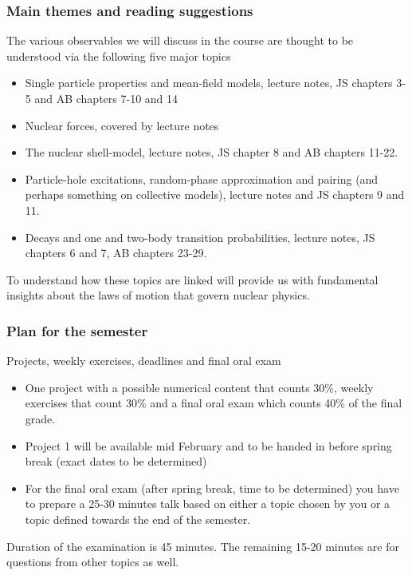 \documentclass{beamer}
\begin{document}
\begin{frame}
\frametitle{Main themes and reading suggestions}

\begin{block}{}
The various observables we will discuss in the course are thought to be understood via the following five 
major topics
\begin{itemize}
\item Single  particle properties and mean-field models, lecture notes, JS chapters 3-5 and AB chapters 7-10 and 14

\item Nuclear forces, covered by lecture notes

\item The nuclear shell-model, lecture notes, JS chapter 8 and AB chapters 11-22.

\item Particle-hole excitations, random-phase approximation and pairing (and perhaps something on collective models), lecture notes and JS chapters 9 and 11.

\item Decays and one and two-body transition probabilities, lecture notes, JS chapters 6 and 7, AB chapters 23-29.
\end{itemize}

\noindent
To understand how these topics are linked will provide us with fundamental insights about the laws of motion that govern nuclear physics.
\end{block}
\end{frame}

\begin{frame}
\frametitle{Plan for the semester}

\begin{block}{Projects, weekly exercises, deadlines and final oral exam }
\begin{itemize}
\item One  project with a possible numerical content that counts 30\%, weekly exercises  that count 30\% and a final oral exam which counts 40\% of the final grade. 

\item Project 1 will be available mid February and to be handed in before spring break (exact dates to be determined)

\item For the final oral exam (after spring break, time to be determined) you have to prepare a 25-30 minutes talk based on either a topic chosen by you or a topic defined towards the end of the semester.
\end{itemize}

\noindent
Duration of the examination is 45 minutes. The remaining 15-20 minutes are for questions from other topics as well. 
\end{block}
\end{frame}
\end{document}
